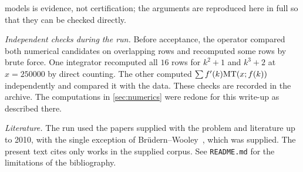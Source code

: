 models is evidence, not certification; the arguments are reproduced here in full so that they can be checked directly.

\emph{Independent checks during the run.} Before acceptance, the operator compared both numerical candidates on overlapping rows and recomputed some rows by brute force. One integrator recomputed all $16$ rows for $k^2+1$ and $k^3+2$ at $x=250000$ by direct counting. The other computed $\sum f'(k)\mathrm{MT}(x;f(k))$ independently and compared it with the data. These checks are recorded in the archive. The computations in \cref{sec:numerics} were redone for this write-up as described there.

\emph{Literature.} The run used the papers supplied with the problem and literature up to 2010, with the single exception of Brüdern--Wooley~\cite{BruedernWooley2011}, which was supplied. The present text cites only works in the supplied corpus. See \texttt{README.md} for the limitations of the bibliography.
